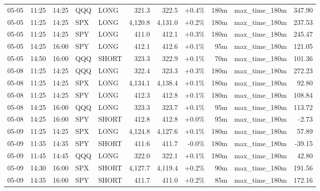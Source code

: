 \documentclass[11pt,a4paper,twoside]{article}
\begin{document}
\begin{center}
\begin{longtable}{>{\color{txtmain}}l l l l l r r r r >{\color{txtmain}}l r}
05-05 & 11:25 & 14:25 & QQQ & LONG & 321.3 & 322.5 & \textcolor{wingreen}{+0.4\%} & 180m & max\_time\_180m & \textcolor{wingreen}{347.90} \\
05-05 & 11:25 & 14:25 & SPX & LONG & 4,120.8 & 4,131.0 & \textcolor{wingreen}{+0.2\%} & 180m & max\_time\_180m & \textcolor{wingreen}{237.53} \\
05-05 & 11:25 & 14:25 & SPY & LONG & 411.0 & 412.1 & \textcolor{wingreen}{+0.3\%} & 180m & max\_time\_180m & \textcolor{wingreen}{245.47} \\
05-05 & 14:25 & 16:00 & SPY & LONG & 412.1 & 412.6 & \textcolor{wingreen}{+0.1\%} & 95m & max\_time\_180m & \textcolor{wingreen}{121.05} \\
05-05 & 14:50 & 16:00 & QQQ & SHORT & 323.3 & 322.9 & \textcolor{wingreen}{+0.1\%} & 70m & max\_time\_180m & \textcolor{wingreen}{101.36} \\
05-08 & 11:25 & 14:25 & QQQ & LONG & 322.4 & 323.3 & \textcolor{wingreen}{+0.3\%} & 180m & max\_time\_180m & \textcolor{wingreen}{272.23} \\
05-08 & 11:25 & 14:25 & SPX & LONG & 4,134.1 & 4,138.4 & \textcolor{wingreen}{+0.1\%} & 180m & max\_time\_180m & \textcolor{wingreen}{92.80} \\
05-08 & 11:25 & 14:25 & SPY & LONG & 412.3 & 412.8 & \textcolor{wingreen}{+0.1\%} & 180m & max\_time\_180m & \textcolor{wingreen}{108.84} \\
05-08 & 14:25 & 16:00 & QQQ & LONG & 323.3 & 323.7 & \textcolor{wingreen}{+0.1\%} & 95m & max\_time\_180m & \textcolor{wingreen}{113.72} \\
05-08 & 14:25 & 16:00 & SPY & SHORT & 412.8 & 412.8 & \textcolor{wingreen}{+0.0\%} & 95m & max\_time\_180m & \textcolor{lossred}{-2.73} \\
05-09 & 11:25 & 14:25 & SPX & LONG & 4,124.8 & 4,127.6 & \textcolor{wingreen}{+0.1\%} & 180m & max\_time\_180m & \textcolor{wingreen}{57.89} \\
05-09 & 11:35 & 14:35 & SPY & SHORT & 411.6 & 411.7 & \textcolor{lossred}{-0.0\%} & 180m & max\_time\_180m & \textcolor{lossred}{-39.15} \\
05-09 & 11:45 & 14:45 & QQQ & LONG & 322.0 & 322.1 & \textcolor{wingreen}{+0.1\%} & 180m & max\_time\_180m & \textcolor{wingreen}{42.80} \\
05-09 & 14:30 & 16:00 & SPX & SHORT & 4,127.7 & 4,119.4 & \textcolor{wingreen}{+0.2\%} & 90m & max\_time\_180m & \textcolor{wingreen}{191.56} \\
05-09 & 14:35 & 16:00 & SPY & SHORT & 411.7 & 411.0 & \textcolor{wingreen}{+0.2\%} & 85m & max\_time\_180m & \textcolor{wingreen}{172.16} \\

\end{longtable}
\end{center}
\end{document}
